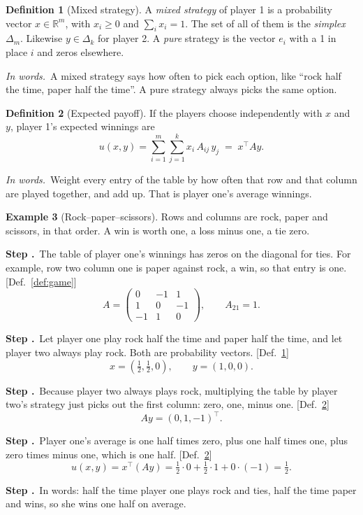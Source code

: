 \documentclass[11pt]{article}
\newcommand{\R}{\mathbb R}\newcommand{\expl}{\mathrm{expl}}
\theoremstyle{definition}
\newtheorem{definition}{Definition}[section]
\newtheorem{example}[definition]{Example}
\newcommand{\inwords}{\par\smallskip\noindent\textit{In words.}\ }
\newcounter{stp}
\newcommand{\steps}{\setcounter{stp}{0}}
\newcommand{\st}{\stepcounter{stp}\par\medskip\noindent\textbf{Step \arabic{stp}.}\ }
\newcommand{\by}[1]{\hfill{\small\color{blue!50!black}[#1]}}
\newcommand{\Def}[1]{Def.~\ref{#1}}\newcommand{\Lem}[1]{Lemma~\ref{#1}}\newcommand{\Thm}[1]{Thm.~\ref{#1}}
\begin{document}
\begin{definition}[Mixed strategy]\label{def:mixed}
A \emph{mixed strategy} of player 1 is a probability vector $x\in\R^m$, with $x_i\ge0$ and $\sum_i x_i=1$. The set of all
of them is the \emph{simplex} $\Delta_m$. Likewise $y\in\Delta_k$ for player 2. A \emph{pure} strategy is the vector
$e_i$ with a 1 in place $i$ and zeros elsewhere.
\inwords A mixed strategy says how often to pick each option, like ``rock half the time, paper half the time''. A pure
strategy always picks the same option.
\end{definition}

\begin{definition}[Expected payoff]\label{def:payoff}
If the players choose independently with $x$ and $y$, player 1's expected winnings are
\[ u(x,y)=\sum_{i=1}^m\sum_{j=1}^k x_i\,A_{ij}\,y_j \;=\; x^\top A y . \]
\inwords Weight every entry of the table by how often that row and that column are played together, and add up. That is
player one's average winnings.
\end{definition}

\begin{example}[Rock--paper--scissors]\label{ex:rps}
Rows and columns are rock, paper and scissors, in that order. A win is worth one, a loss minus one, a tie zero.
\steps
\st The table of player one's winnings has zeros on the diagonal for ties. For example, row two column one is paper
against rock, a win, so that entry is one. \by{\Def{def:game}}
\[ A=\begin{pmatrix}0&-1&1\\1&0&-1\\-1&1&0\end{pmatrix},\qquad A_{21}=1. \]
\st Let player one play rock half the time and paper half the time, and let player two always play rock. Both are
probability vectors. \by{\Def{def:mixed}}
\[ x=(\tfrac12,\tfrac12,0),\qquad y=(1,0,0). \]
\st Because player two always plays rock, multiplying the table by player two's strategy just picks out the first column:
zero, one, minus one. \by{\Def{def:payoff}}
\[ Ay=(0,1,-1)^\top. \]
\st Player one's average is one half times zero, plus one half times one, plus zero times minus one, which is one half.
\by{\Def{def:payoff}}
\[ u(x,y)=x^\top(Ay)=\tfrac12\cdot0+\tfrac12\cdot1+0\cdot(-1)=\tfrac12. \]
\st In words: half the time player one plays rock and ties, half the time paper and wins, so she wins one half on average.
\end{example}
\end{document}
